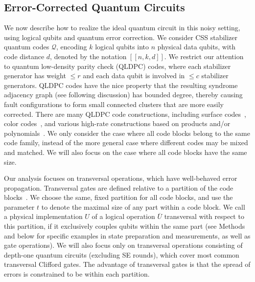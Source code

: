 \subsection{Error-Corrected Quantum Circuits}
We now describe how to realize the ideal quantum circuit in this noisy setting, using logical qubits and quantum error correction.
%
We consider CSS stabilizer quantum codes $\mathcal{Q}$, encoding $k$ logical qubits into $n$ physical data qubits, with code distance $d$, denoted by the notation $[[n,k,d]]$.
%
We restrict our attention to quantum low-density parity check (QLDPC) codes, where each stabilizer generator has weight $\leq r$ and each data qubit is involved in $\leq c$ stabilizer generators.
%
QLDPC codes have the nice property that the resulting syndrome adjacency graph (see following discussion) has bounded degree, thereby causing fault configurations to form small connected clusters that are more easily corrected.
%
There are many QLDPC code constructions, including surface codes~\cite{kitaev2000unpaired,fowler2012surface}, color codes~\cite{bombin2006topological}, and various high-rate constructions based on products and/or polynomials~\cite{tillich2014quantum,breuckmann2021quantum,bravyi2013homological,hastings2021fiber,breuckmann2020balanced,panteleev2022quantum,panteleev2022asymptotically,kovalev2013quantum,bravyi2024high}.
%
We only consider the case where all code blocks belong to the same code family, instead of the more general case where different codes may be mixed and matched.
%
We will also focus on the case where all code blocks have the same size.

Our analysis focuses on transversal operations, which have well-behaved error propagation.
%
Transversal gates are defined relative to a partition of the code blocks~\cite{eastin2009restrictions,jochym-oconnor2018disjointness}.
%
We choose the same, fixed partition for all code blocks, and use the parameter $t$ to denote the maximal size of any part within a code block.
%
We call a physical implementation $U$ of a logical operation $\overline{U}$ transversal with respect to this partition, if it exclusively couples qubits within the same part (see Methods and below for specific examples in state preparation and measurements, as well as gate operations).
%
We will also focus only on transversal operations consisting of depth-one quantum circuits (excluding SE rounds), which cover most common transversal Clifford gates.
%
The advantage of transversal gates is that the spread of errors is constrained to be within each partition.

